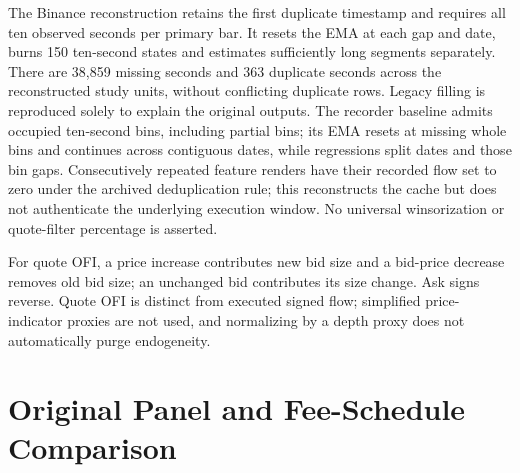 \documentclass[12pt]{article}
\theoremstyle{definition}
\theoremstyle{remark}
\begin{document}
The Binance reconstruction retains the first duplicate timestamp and requires all ten observed seconds per primary bar. It resets the EMA at each gap and date, burns 150 ten-second states and estimates sufficiently long segments separately. There are 38,859 missing seconds and 363 duplicate seconds across the reconstructed study units, without conflicting duplicate rows. Legacy filling is reproduced solely to explain the original outputs. The recorder baseline admits occupied ten-second bins, including partial bins; its EMA resets at missing whole bins and continues across contiguous dates, while regressions split dates and those bin gaps. Consecutively repeated feature renders have their recorded flow set to zero under the archived deduplication rule; this reconstructs the cache but does not authenticate the underlying execution window. No universal winsorization or quote-filter percentage is asserted.

For quote OFI, a price increase contributes new bid size and a bid-price decrease removes old bid size; an unchanged bid contributes its size change. Ask signs reverse. Quote OFI is distinct from executed signed flow; simplified price-indicator proxies are not used, and normalizing by a depth proxy does not automatically purge endogeneity.

\section{Original Panel and Fee-Schedule Comparison}
\label{sec:baseline_natural_exp}
\end{document}
